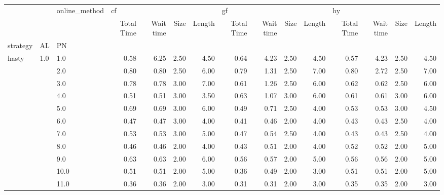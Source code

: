 \begin{tabular}{lllrrrrrrrrrrrr}
\toprule
       &     & online\_method & \multicolumn{4}{l}{cf} & \multicolumn{4}{l}{gf} & \multicolumn{4}{l}{hy} \\
       &     & {} & Total Time & Wait time & Size & Length & Total Time & Wait time & Size & Length & Total Time & Wait time & Size & Length \\
strategy & AL & PN &            &           &      &        &            &           &      &        &            &           &      &        \\
\midrule
hasty & 1.0 & 1.0  &       0.58 &      6.25 & 2.50 &   4.50 &       0.64 &      4.23 & 2.50 &   4.50 &       0.57 &      4.23 & 2.50 &   4.50 \\
       &     & 2.0  &       0.80 &      0.80 & 2.50 &   6.00 &       0.79 &      1.31 & 2.50 &   7.00 &       0.80 &      2.72 & 2.50 &   7.00 \\
       &     & 3.0  &       0.78 &      0.78 & 3.00 &   7.00 &       0.61 &      1.26 & 2.50 &   6.00 &       0.62 &      0.62 & 2.50 &   6.00 \\
       &     & 4.0  &       0.51 &      0.51 & 3.00 &   3.50 &       0.63 &      1.07 & 3.00 &   6.00 &       0.61 &      0.61 & 3.00 &   6.00 \\
       &     & 5.0  &       0.69 &      0.69 & 3.00 &   6.00 &       0.49 &      0.71 & 2.50 &   4.00 &       0.53 &      0.53 & 3.00 &   4.50 \\
       &     & 6.0  &       0.47 &      0.47 & 3.00 &   4.00 &       0.41 &      0.46 & 2.00 &   4.00 &       0.43 &      0.43 & 2.50 &   4.00 \\
       &     & 7.0  &       0.53 &      0.53 & 3.00 &   5.00 &       0.47 &      0.54 & 2.50 &   4.00 &       0.43 &      0.43 & 2.50 &   4.00 \\
       &     & 8.0  &       0.46 &      0.46 & 2.00 &   4.00 &       0.43 &      0.51 & 2.00 &   4.00 &       0.52 &      0.52 & 2.00 &   5.00 \\
       &     & 9.0  &       0.63 &      0.63 & 2.00 &   6.00 &       0.56 &      0.57 & 2.00 &   5.00 &       0.56 &      0.56 & 2.00 &   5.00 \\
       &     & 10.0 &       0.51 &      0.51 & 2.00 &   5.00 &       0.36 &      0.49 & 2.00 &   3.00 &       0.51 &      0.51 & 2.00 &   5.00 \\
       &     & 11.0 &       0.36 &      0.36 & 2.00 &   3.00 &       0.31 &      0.31 & 2.00 &   3.00 &       0.35 &      0.35 & 2.00 &   3.00 \\

\end{tabular}
